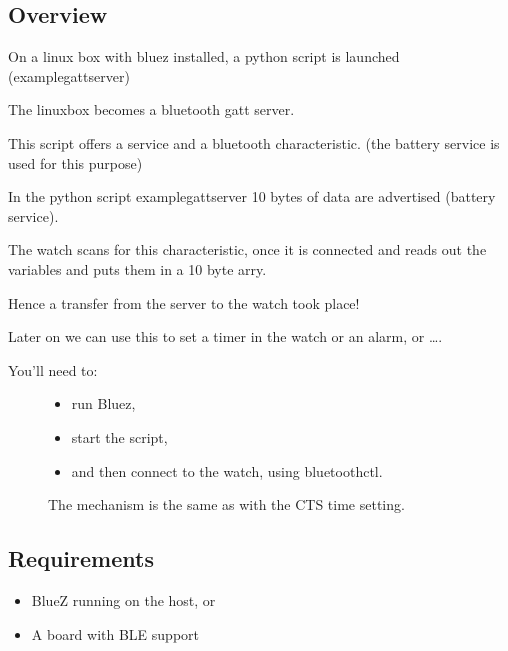 \documentclass[letterpaper,10pt,english]{sphinxmanual}
\begin{document}
\subsection{Overview}
\label{\detokenize{samples/samplesbluetoothperipheral-getparamREADME:overview}}
On a linux box with bluez installed,  a python script is launched (example\sphinxhyphen{}gatt\sphinxhyphen{}server)

The linuxbox becomes a bluetooth gatt server.

This script offers a service and a bluetooth characteristic. (the battery service is used for this purpose)

In the python script example\sphinxhyphen{}gatt\sphinxhyphen{}server 10 bytes of data are advertised (battery service).

The watch scans for this characteristic, once it is connected and reads out the variables and puts them in a 10 byte arry.

Hence a transfer from the server to the watch took place!

Later on we can use this to set a timer in the watch or an alarm, or ….
\begin{description}
\item[{You’ll need to:}] \leavevmode\begin{itemize}
\item {} 
run Bluez,

\item {} 
start the script,

\item {} 
and then connect to the watch, using bluetoothctl.

\end{itemize}

The mechanism is the same as with the CTS time setting.

\end{description}


\subsection{Requirements}
\label{\detokenize{samples/samplesbluetoothperipheral-getparamREADME:requirements}}\begin{itemize}
\item {} 
BlueZ running on the host, or

\item {} 
A board with BLE support

\end{itemize}
\end{document}
